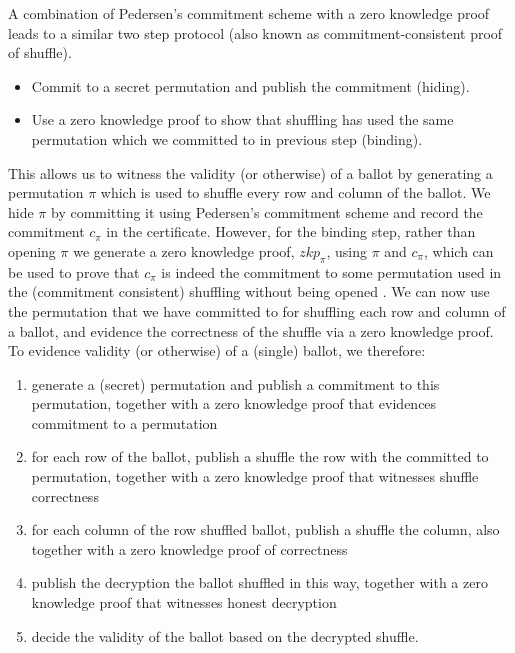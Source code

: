 \documentclass{llncs}
\begin{document}
\noindent
A combination of Pedersen's commitment scheme 
with a zero knowledge proof leads to a similar two step protocol (also known 
as commitment-consistent proof of shuffle)\cite{Wikstrom:2009:CPS}.

\begin{itemize}
\item Commit to a secret permutation and publish the commitment (hiding).
\item Use a zero knowledge proof to show that shuffling has used 
      the same permutation which we committed to in previous step (binding).
\end{itemize}  

\noindent
This allows us to witness the validity (or otherwise) of a ballot by generating a 
permutation $\pi$ which is used to shuffle every row and column of the ballot.
We hide $\pi$ by committing it using Pedersen's 
commitment scheme 
and record the commitment $c_{\pi}$ in the certificate. However, for the binding step, rather 
than opening $\pi$ we generate a zero knowledge proof, $zkp_{\pi}$, 
using $\pi$ and $c_{\pi}$, which can 
be  used to prove that $c_{\pi}$ is indeed the commitment to some permutation
used in the (commitment consistent) shuffling 
 without being opened \cite{Wikstrom:2009:CPS}. We can now use the
 permutation that we have committed to for 
shuffling each row and column of a ballot, and evidence the
correctness of the shuffle via a zero knowledge proof.
%
To evidence validity (or otherwise) of a (single) ballot, we
therefore:
\begin{enumerate}
  \item generate a (secret) permutation and publish a commitment to this
  permutation, together with a zero knowledge proof that evidences commitment
  to a permutation
  \item for each row of the ballot, publish a shuffle the row with
  the committed to permutation, together with a zero knowledge proof
  that witnesses shuffle correctness
  \item for each column of the row shuffled ballot, publish a
  shuffle the column, also together with a zero knowledge proof of
  correctness 
  \item publish the decryption the ballot shuffled in this way, together with a
  zero knowledge proof that witnesses honest decryption
  \item decide the validity of the ballot based on the decrypted
  shuffle.
\end{enumerate}
\end{document}

